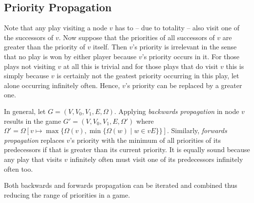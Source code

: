 



\subsection{Priority Propagation}

Note that any play visiting a node $v$ has to -- due to totality -- also visit one of the successors of 
$v$. Now suppose that the priorities of all successors of $v$ are greater than the priority of $v$ itself.
Then $v$'s priority is irrelevant in the sense that no play is won by either player because $v$'s priority
occurs in it. For those plays not visiting $v$ at all this is trivial and for those plays that do visit
$v$ this is simply because $v$ is certainly not the geatest priority occurring in this play, let alone
occurring infinitely often. Hence, $v$'s priority can be replaced by a greater one. 

In general, let $G = (V,V_0,V_1,E,\Omega)$. Applying \emph{backwards propagation} in node $v$ results in
the game $G' = (V,V_0,V_1,E,\Omega')$ where 
$\Omega' = \Omega[v \mapsto \max \{ \Omega(v), \min \{ \Omega(w) \mid w \in vE \} \}]$.
Similarly, \emph{forwards propagation} replaces $v$'s priority with the minimum of all
priorities of its predecessors if that is greater than its current priority. It is equally sound because
any play that visits $v$ infinitely often must visit one of its predecessors infinitely often too.

Both backwards and forwards propagation can be iterated and combined thus reducing the range of priorities
in a game.






